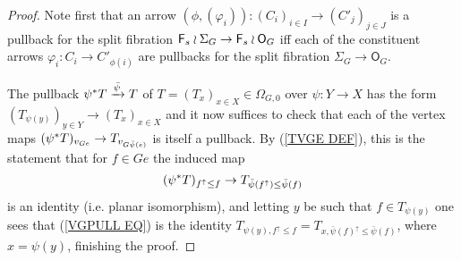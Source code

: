 \documentclass[a4paper,10pt]{article}%
\begin{document}
\begin{proof}
Note first that an arrow 
$(\phi,(\varphi_i))\colon (C_i)_{i \in I} \to (C'_j)_{j\in J}$
is a pullback for the split fibration 
$\mathsf{F}_s \wr \Sigma_G \to \mathsf{F}_s \wr \mathsf{O}_G$
iff each of the constituent arrows
$\varphi_i \colon C_i \to C'_{\phi(i)}$
are pullbacks for the split fibration $\Sigma_G \to \mathsf{O}_G$.

The pullback
$\psi^{\**} T \xrightarrow{\bar{\psi}} T$
of $T = (T_x)_{x \in X} \in \Omega_{G,0}$
over $\psi \colon Y \to X$
has the form 
$(T_{\psi(y)})_{y \in Y} \to (T_x)_{x \in X}$
and it now suffices to check that each of the vertex maps
$
	(\psi^{\**} T)_{v_{G e}} \to T_{v_{G \bar{\psi}(e)}}
$
is itself a pullback.
By (\ref{TVGE DEF}), this is the statement that for 
$f \in G e$ the induced map
\begin{equation}\label{VGPULL EQ}
	(\psi^{\**}T)_{f^{\uparrow} \leq f} \to 
	T_{\bar{\psi}(f^{\uparrow}) \leq \bar{\psi} (f)}
\end{equation}
is an identity (i.e. planar isomorphism),
and letting $y$ be such that $f \in T_{\psi(y)}$
one sees that (\ref{VGPULL EQ})
is the identity
$T_{\psi(y),f^{\uparrow} \leq f} = 
T_{x,\bar{\psi}(f)^{\uparrow} \leq \bar{\psi}(f)}$, where $x=\psi(y)$, finishing the proof.
\end{proof}
\end{document}
